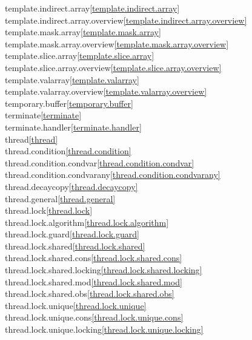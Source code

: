 \begin{multicols}{2}
template.indirect.array\quad\ref{template.indirect.array}\\
template.indirect.array.overview\quad\ref{template.indirect.array.overview}\\
template.mask.array\quad\ref{template.mask.array}\\
template.mask.array.overview\quad\ref{template.mask.array.overview}\\
template.slice.array\quad\ref{template.slice.array}\\
template.slice.array.overview\quad\ref{template.slice.array.overview}\\
template.valarray\quad\ref{template.valarray}\\
template.valarray.overview\quad\ref{template.valarray.overview}\\
temporary.buffer\quad\ref{temporary.buffer}\\
terminate\quad\ref{terminate}\\
terminate.handler\quad\ref{terminate.handler}\\
thread\quad\ref{thread}\\
thread.condition\quad\ref{thread.condition}\\
thread.condition.condvar\quad\ref{thread.condition.condvar}\\
thread.condition.condvarany\quad\ref{thread.condition.condvarany}\\
thread.decaycopy\quad\ref{thread.decaycopy}\\
thread.general\quad\ref{thread.general}\\
thread.lock\quad\ref{thread.lock}\\
thread.lock.algorithm\quad\ref{thread.lock.algorithm}\\
thread.lock.guard\quad\ref{thread.lock.guard}\\
thread.lock.shared\quad\ref{thread.lock.shared}\\
thread.lock.shared.cons\quad\ref{thread.lock.shared.cons}\\
thread.lock.shared.locking\quad\ref{thread.lock.shared.locking}\\
thread.lock.shared.mod\quad\ref{thread.lock.shared.mod}\\
thread.lock.shared.obs\quad\ref{thread.lock.shared.obs}\\
thread.lock.unique\quad\ref{thread.lock.unique}\\
thread.lock.unique.cons\quad\ref{thread.lock.unique.cons}\\
thread.lock.unique.locking\quad\ref{thread.lock.unique.locking}\\

\end{multicols}
